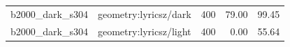 \begin{longtable}{l>{\raggedright\arraybackslash}p{.42\linewidth}rrr}
b2000\_\allowbreak{}dark\_\allowbreak{}s304 & %
geometry:lyricsz/dark & %
400 & %
79.00 & %
99.45 \\ %

b2000\_\allowbreak{}dark\_\allowbreak{}s304 & %
geometry:lyricsz/light & %
400 & %
0.00 & %
55.64 \\ %


\end{longtable}
